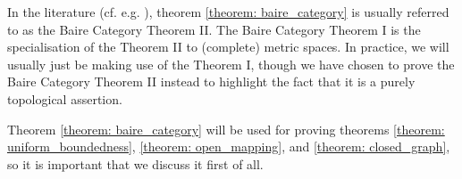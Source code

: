         \begin{remark} \label{remark: baire_category_theorems_1_and_2}
            In the literature (cf. e.g. \cite[Theorem 2.2.2]{litvak_functional_analysis_notes}), theorem \ref{theorem: baire_category} is usually referred to as the Baire Category Theorem II. The Baire Category Theorem I is the specialisation of the Theorem II to (complete) metric spaces. In practice, we will usually just be making use of the Theorem I, though we have chosen to prove the Baire Category Theorem II instead to highlight the fact that it is a purely topological assertion.
        \end{remark}
        \begin{remark}
            Theorem \ref{theorem: baire_category} will be used for proving theorems \ref{theorem: uniform_boundedness}, \ref{theorem: open_mapping}, and \ref{theorem: closed_graph}, so it is important that we discuss it first of all.
        \end{remark}

